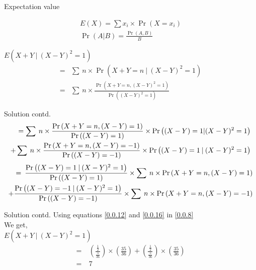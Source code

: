 \documentclass{beamer}
\providecommand{\brak}[1]{\ensuremath{\left(#1\right)}}
\begin{document}
\begin{frame}{Expectation value}
    \begin{block}
        \begin{align}
            E\brak{X}=\sum x_{i}\times\Pr\brak{X=x_{i}}\\
            \Pr\brak{A|B}=\frac{\Pr\brak{A,B}}{B}
        \end{align}
    \end{block}
    \begin{block}
        $E\brak{X+Y\:|\:(X-Y)^2=1}$
        \begin{align}
            =&\sum\:n\times\Pr\brak{X+Y=n\:|\:(X-Y)^2=1}\\
            =&\sum\:n\times\frac{\Pr\brak{X+Y=n,(X-Y)^2=1}}{\Pr\brak{(X-Y)^2=1}}
        \end{align}
    \end{block}
\end{frame}
\begin{frame}{Solution contd.}
    \begin{align}
        \begin{split}
            =\sum\:n\times\frac{\Pr\brak{X+Y=n,(X-Y)=1}}{\Pr\brak{(X-Y)=1}}\times\Pr\brak{(X-Y)=1|(X-Y)^2=1}
            \bigskip\\
            +\sum\:n\times\frac{\Pr\brak{X+Y=n,(X-Y)=-1}}{\Pr\brak{(X-Y)=-1}}\times\Pr\brak{(X-Y)=1\:|\:(X-Y)^2=1}
        \end{split}
    \end{align}
    \begin{align}
        \begin{split}
            =\:\frac{\Pr\brak{(X-Y)=1\:|\:(X-Y)^2=1}}{\Pr\brak{(X-Y)=1}}
            \times\sum\:n\times\Pr\brak{X+Y=n,(X-Y)=1}
            \bigskip\\
            +\frac{\Pr\brak{(X-Y)=-1\:|\:(X-Y)^2=1}}{\Pr\brak{(X-Y)=-1}}
            \times\sum\:n\times\Pr\brak{X+Y=n,(X-Y)=-1}\label{0.0.8}
        \end{split}
    \end{align}
\end{frame}
\begin{frame}{Solution contd.}
    Using equations \eqref{0.0.12} and \eqref{0.0.16} in \eqref{0.0.8}\\
    We get,\\
    \newline
    $E\brak{X+Y\:|\:(X-Y)^2=1}$
    \begin{align}
        =&\:\brak{\frac{\frac{1}{2}}{\frac{5}{36}}}\times\brak{\frac{35}{36}}+\brak{\frac{\frac{1}{2}}{\frac{5}{36}}}\times\brak{\frac{35}{36}}\\
        =&\:7
    \end{align}
\end{frame}
\end{document}
